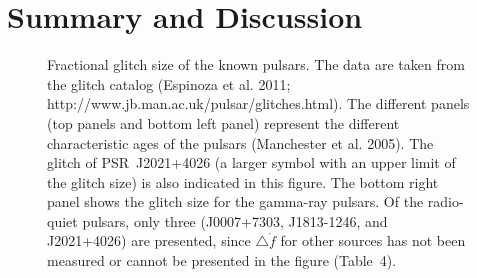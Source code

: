 \documentclass[12pt,preprint]{aastex}
\begin{document}
\section{Summary and Discussion}
\begin{figure}
  \centering
  \caption{Fractional glitch size of the known pulsars. The data are taken from the glitch catalog (Espinoza et al. 2011; http://www.jb.man.ac.uk/pulsar/glitches.html). The different panels (top panels and bottom left panel)
    represent the different characteristic ages of the pulsars (Manchester et al. 2005).
    The glitch of PSR~J2021+4026 (a larger symbol  with an upper  limit of the glitch size) is also indicated in this figure. The bottom right  panel shows the glitch size for the   gamma-ray pulsars. Of the radio-quiet pulsars, 
      only three (J0007+7303, J1813-1246, and J2021+4026) are presented, since $\triangle \dot f$  for  other sources has not been measured or cannot be presented in the figure (Table~4).}
  \label{size}
\end{figure}
\label{disc}
\end{document}

